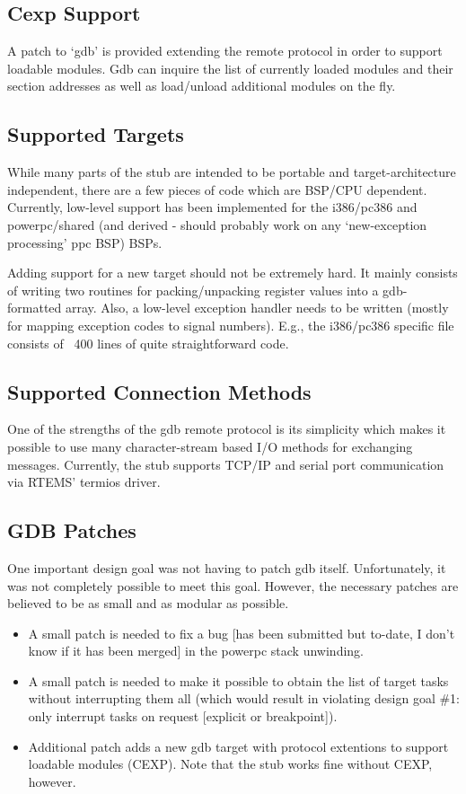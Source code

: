 \documentclass{article}
\begin{document}
\subsection{Cexp Support}
A patch to `gdb' is provided extending the remote protocol
in order to support loadable modules. Gdb can inquire the
list of currently loaded modules and their section addresses
as well as load/unload additional modules on the fly.

\subsection{Supported Targets}
While many parts of the stub are intended to be portable
and target-architecture independent, there are a few pieces of code
which are BSP/CPU dependent. Currently, low-level support
has been implemented for the i386/pc386 and
powerpc/shared (and derived - should probably work on any
`new-exception processing' ppc BSP) BSPs.

Adding support for a new target should not be extremely
hard. It mainly consists of writing two routines for
packing/unpacking register values into a gdb-formatted
array. Also, a low-level exception handler needs to be
written (mostly for mapping exception codes to signal numbers).
E.g., the i386/pc386 specific file consists of ~400 lines
of quite straightforward code.

\subsection{Supported Connection Methods}
One of the strengths of the gdb remote protocol is its simplicity
which makes it possible to use many character-stream based
I/O methods for exchanging messages.
Currently, the stub supports TCP/IP and serial port communication
via RTEMS' termios driver.

\subsection{GDB Patches}
One important design goal was not having to patch gdb itself.
Unfortunately, it was not completely possible to meet this
goal. However, the necessary patches are believed to be
as small and as modular as possible.

\begin{itemize}
\item
 A small patch is needed to fix a bug [has been submitted
 but to-date, I don't know if it has been merged] in the
 powerpc stack unwinding.
\item
 A small patch is needed to make it possible to obtain
 the list of target tasks without interrupting them all
 (which would result in violating design goal \#1: only
 interrupt tasks on request [explicit or breakpoint]).
\item
 Additional patch adds a new gdb target with protocol
 extentions to support loadable modules (CEXP). Note that
 the stub works fine without CEXP, however.
\end{itemize}
\end{document}
